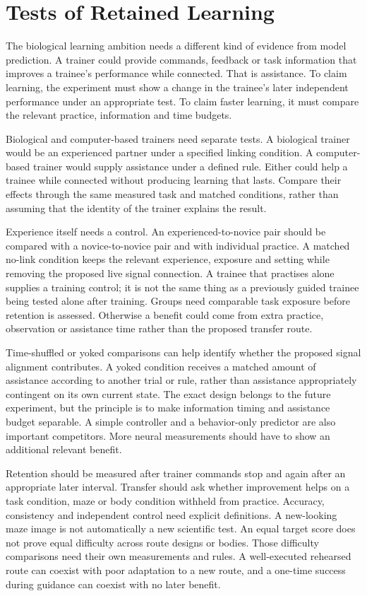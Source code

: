 \section{Tests of Retained Learning}

The biological learning ambition needs a different kind of evidence from model prediction. A trainer could provide commands, feedback or task information that improves a trainee's performance while connected. That is assistance. To claim learning, the experiment must show a change in the trainee's later independent performance under an appropriate test. To claim faster learning, it must compare the relevant practice, information and time budgets.

Biological and computer-based trainers need separate tests. A biological trainer would be an experienced partner under a specified linking condition. A computer-based trainer would supply assistance under a defined rule. Either could help a trainee while connected without producing learning that lasts. Compare their effects through the same measured task and matched conditions, rather than assuming that the identity of the trainer explains the result.

Experience itself needs a control. An experienced-to-novice pair should be compared with a novice-to-novice pair and with individual practice. A matched no-link condition keeps the relevant experience, exposure and setting while removing the proposed live signal connection. A trainee that practises alone supplies a training control; it is not the same thing as a previously guided trainee being tested alone after training. Groups need comparable task exposure before retention is assessed. Otherwise a benefit could come from extra practice, observation or assistance time rather than the proposed transfer route.

Time-shuffled or yoked comparisons can help identify whether the proposed signal alignment contributes. A yoked condition receives a matched amount of assistance according to another trial or rule, rather than assistance appropriately contingent on its own current state. The exact design belongs to the future experiment, but the principle is to make information timing and assistance budget separable. A simple controller and a behavior-only predictor are also important competitors. More neural measurements should have to show an additional relevant benefit.

Retention should be measured after trainer commands stop and again after an appropriate later interval. Transfer should ask whether improvement helps on a task condition, maze or body condition withheld from practice. Accuracy, consistency and independent control need explicit definitions. A new-looking maze image is not automatically a new scientific test. An equal target score does not prove equal difficulty across route designs or bodies. Those difficulty comparisons need their own measurements and rules. A well-executed rehearsed route can coexist with poor adaptation to a new route, and a one-time success during guidance can coexist with no later benefit.

